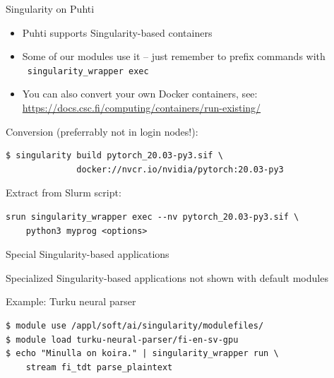 \documentclass[aspectratio=1610,14pt]{beamer}
\newcommand{\link}[1]{\alert{\url{#1}}}
\begin{document}
\begin{frame}[fragile]{Singularity on Puhti}
  \begin{itemize}
  \item Puhti supports Singularity-based containers
  \item Some of our modules use it -- just remember to prefix commands with \
    {\tt singularity\_wrapper exec}
  \item You can also convert your own Docker containers, see:
    {\small \link{https://docs.csc.fi/computing/containers/run-existing/}}
  \end{itemize}

  \vspace{5mm}
  Conversion (preferrably not in login nodes!):
  \vspace{-4mm}
\begin{verbatim}
$ singularity build pytorch_20.03-py3.sif \
              docker://nvcr.io/nvidia/pytorch:20.03-py3
\end{verbatim}

Extract from Slurm script:
\vspace{-4mm}
\begin{verbatim}
srun singularity_wrapper exec --nv pytorch_20.03-py3.sif \
    python3 myprog <options>
\end{verbatim}
  
\end{frame}

\begin{frame}[fragile]{Special Singularity-based applications}

  Specialized Singularity-based applications not shown with default modules

  \vspace{1em}

  \alert{Example:} Turku neural parser

\begin{verbatim}
$ module use /appl/soft/ai/singularity/modulefiles/
$ module load turku-neural-parser/fi-en-sv-gpu
$ echo "Minulla on koira." | singularity_wrapper run \
    stream fi_tdt parse_plaintext
\end{verbatim}
  
\end{frame}
\end{document}
